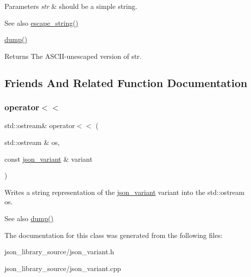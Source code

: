 \begin{DoxyParams}{Parameters}
{\em str} & should be a simple string. \\
\hline
\end{DoxyParams}
\begin{DoxySeeAlso}{See also}
\hyperlink{classJSONLIB__NAMESPACE_1_1json__variant_a4c2354098f97b91b5a07dbda981673cf}{escape\+\_\+string()} 

\hyperlink{classJSONLIB__NAMESPACE_1_1json__variant_a72d4a39d77b76f076354219edc6ea4a0}{dump()} 
\end{DoxySeeAlso}
\begin{DoxyReturn}{Returns}
The A\+S\+C\+I\+I-\/unescaped version of {\ttfamily str}. 
\end{DoxyReturn}


\subsection{Friends And Related Function Documentation}
\mbox{\label{classJSONLIB__NAMESPACE_1_1json__variant_a753abbab1ca55cbb0dbb9dc9e95a4983}} 
\subsubsection{\texorpdfstring{operator$<$$<$}{operator<<}}
{\footnotesize\ttfamily std\+::ostream\& operator$<$$<$ (\begin{DoxyParamCaption}\item[{std\+::ostream \&}]{os,  }\item[{const \hyperlink{classJSONLIB__NAMESPACE_1_1json__variant}{json\+\_\+variant} \&}]{variant }\end{DoxyParamCaption})\hspace{0.3cm}{\ttfamily [friend]}}



Writes a string representation of the \hyperlink{classJSONLIB__NAMESPACE_1_1json__variant}{json\+\_\+variant} {\ttfamily variant} into the std\+::ostream {\ttfamily os}. 

\begin{DoxySeeAlso}{See also}
\hyperlink{classJSONLIB__NAMESPACE_1_1json__variant_a72d4a39d77b76f076354219edc6ea4a0}{dump()} 
\end{DoxySeeAlso}


The documentation for this class was generated from the following files\+:\begin{DoxyCompactItemize}
\item 
json\+\_\+library\+\_\+source/json\+\_\+variant.\+h\item 
json\+\_\+library\+\_\+source/json\+\_\+variant.\+cpp\end{DoxyCompactItemize}
